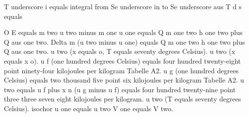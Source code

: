 T underscore i equals integral from Se underscore in to Se underscore aus T d s equals

O E equals m two u two minus m one u one equals Q m one two h one two plus Q aus one two. Delta m (u two minus u one) equals Q m one two h one two plus Q aus one two. u two (x equals o, T equals seventy degrees Celsius). u two (x equals x o). u f (one hundred degrees Celsius) equals four hundred twenty-eight point ninety-four kilojoules per kilogram Tabelle A2. u g (one hundred degrees Celsius) equals two thousand five point six kilojoules per kilogram Tabelle A2. u two equals u f plus x n (u g minus u f) equals four hundred twenty-nine point three three seven eight kilojoules per kilogram. u two (T equals seventy degrees Celsius). isochor u one equals u two V one equals V two.